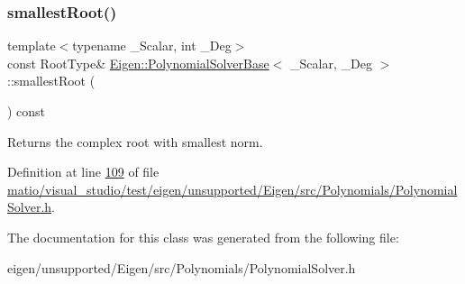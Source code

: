 \mbox{\label{class_eigen_1_1_polynomial_solver_base_a64389d0acf586c772fb3d1db47a3f7ef}} 
\subsubsection{\texorpdfstring{smallest\+Root()}{smallestRoot()}\hspace{0.1cm}{\footnotesize\ttfamily [2/2]}}
{\footnotesize\ttfamily template$<$typename \+\_\+\+Scalar, int \+\_\+\+Deg$>$ \\
const Root\+Type\& \hyperlink{class_eigen_1_1_polynomial_solver_base}{Eigen\+::\+Polynomial\+Solver\+Base}$<$ \+\_\+\+Scalar, \+\_\+\+Deg $>$\+::smallest\+Root (\begin{DoxyParamCaption}{ }\end{DoxyParamCaption}) const\hspace{0.3cm}{\ttfamily [inline]}}

\begin{DoxyReturn}{Returns}
the complex root with smallest norm. 
\end{DoxyReturn}


Definition at line \hyperlink{matio_2visual__studio_2test_2eigen_2unsupported_2_eigen_2src_2_polynomials_2_polynomial_solver_8h_source_l00109}{109} of file \hyperlink{matio_2visual__studio_2test_2eigen_2unsupported_2_eigen_2src_2_polynomials_2_polynomial_solver_8h_source}{matio/visual\+\_\+studio/test/eigen/unsupported/\+Eigen/src/\+Polynomials/\+Polynomial\+Solver.\+h}.



The documentation for this class was generated from the following file\+:\begin{DoxyCompactItemize}
\item 
eigen/unsupported/\+Eigen/src/\+Polynomials/\+Polynomial\+Solver.\+h\end{DoxyCompactItemize}
